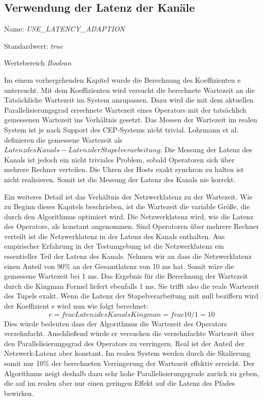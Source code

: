 \subsection{Verwendung der Latenz der Kanäle}

Name: \textit{USE\_LATENCY\_ADAPTION}

Standardwert: \textit{true}

Wertebereich \textit{Boolean}

Im einem vorhergehenden Kapitel wurde die Berechnung des Koeffizienten e untersucht.
Mit dem Koeffizienten wird versucht die berechnete Wartezeit an die Tatsächliche Wartezeit im System anzupassen.
Dazu wird die mit dem aktuellen Parallelisierungsgrad errechnete Wartezeit eines Operators mit der tatsächlich gemessenen Wartezeit ins Verhältnis gesetzt.
Das Messen der Wartezeit im realen System ist je nach Support des CEP-Systems nicht trivial.
Lohrmann et al. definieren die gemessene Wartezeit als \(Latenz des Kanals - Latenz der Stapelverarbeitung\).
Die Messung der Latenz des Kanals ist jedoch ein nicht triviales Problem, sobald Operatoren sich über mehrere Rechner verteilen.
Die Uhren der Hosts exakt synchron zu halten ist nicht realisieren.
Somit ist die Messung der Latenz des Kanals nie korrekt.

Ein weiteres Detail ist das Verhältnis der Netzwerklatenz zu der Wartezeit.
Wie zu Beginn dieses Kapitels beschrieben, ist die Wartezeit die variable Größe, die durch den Algorithmus optimiert wird.
Die Netzwerklatenz wird, wie die Latenz des Operators, als konstant angenommen.
Sind Operatoren über mehrere Rechner verteilt ist die Netzwerklatenz in der Latenz des Kanals enthalten.
Aus empirischer Erfahrung in der Testumgebung ist die Netzwerklatenz ein essentieller Teil der Latenz des Kanals.
Nehmen wir an dass die Netzwerklatenz einen Anteil von 90\% an der Gesamtlatenz von 10 ms hat.
Somit wäre die gemessene Wartezeit bei 1 ms.
Das Ergebnis für die Berechnung der Wartezeit durch die Kingman Formel liefert ebenfalls 1 ms.
Sie trifft also die reale Wartezeit des Tupels exakt.
Wenn die Latenz der Stapelverarbeitung mit null beziffern wird der Koeffizient e wird nun wie folgt berechnet:
\[ e = frac{Latenz des Kanals}{Kingman} = frac{10 / 1} = 10\]
Dies würde bedeuten dass der Algorithmus die Wartezeit des Operators verzehnfacht.
Anschließend würde er versuchen die verzehnfachte Wartezeit über den Parallelisierungsgrad des Operators zu verringern.
Real ist der Anteil der Netzwerk-Latenz aber konstant.
Im realen System werden durch die Skalierung somit nur 10\% der berechneten Verringerung der Wartezeit effektiv erreicht.
Der Algorithmus neigt deshalb dazu sehr hohe Parallelisierungsgrade zurück zu geben, die auf im realen aber nur einen geringen Effekt auf die Latenz des Pfades bewirken.

